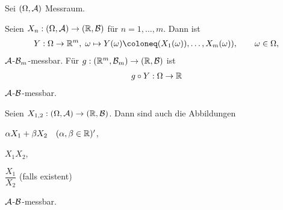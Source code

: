 \begin{prop}
\label{prop:3.6}
Sei $(\Omega , \AA)$ Messraum.
\begin{propenum}
\item
  Seien $X_{n} :(\Omega , \AA) \to (\R , {\BB})$ für $n = 1, \ldots, m$. Dann
  ist
\begin{align*}
 Y: \Omega \to \R^{m},\; \omega\mapsto Y(\omega)\defl (X_{1} (\omega )),
  \ldots , X_{m}(\omega )),\qquad \omega\in\Omega,
\end{align*}
$\AA$-${\cal B}_{m}$-messbar. Für $g: (\R^{m},
{\BB}_{m}) \to (\R, {\BB})$ ist
\begin{align*}
g \circ Y: \Omega \to \R
\end{align*}
$\AA$-${\BB}$-messbar.
\item
Seien $X_{1,2}: (\Omega, \AA) \to (\R, {\BB})$.
Dann sind auch die Abbildungen
\begin{defnpropenum}
  \item $\alpha X_{1} + \beta X_{2} \quad (\alpha , \beta \in \R)'$,
  \item $X_{1}X_{2}$,
  \item $\dfrac{X_{1}}{X_{2}}$ (falls existent)   
\end{defnpropenum}
$\AA$-$\BB$-messbar.\fishhere
\end{propenum}
\end{prop}
